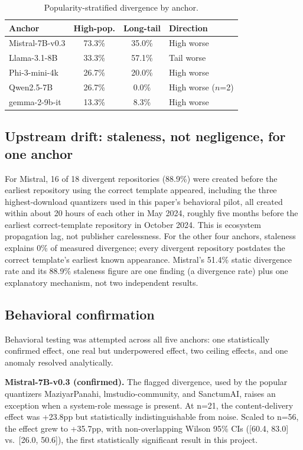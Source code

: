 \documentclass[letterpaper,twocolumn,10pt]{article}
\begin{document}
\begin{table}[t]
\caption{Popularity-stratified divergence by anchor.}
\label{tab:popularity}
\centering
\small
\begin{tabular}{lccl}
\toprule
Anchor & High-pop. & Long-tail & Direction \\
\midrule
Mistral-7B-v0.3 & 73.3\% & 35.0\% & High worse \\
Llama-3.1-8B & 33.3\% & 57.1\% & Tail worse \\
Phi-3-mini-4k & 26.7\% & 20.0\% & High worse \\
Qwen2.5-7B & 26.7\% & 0.0\% & High worse ($n$=2) \\
gemma-2-9b-it & 13.3\% & 8.3\% & High worse \\
\bottomrule
\end{tabular}
\end{table}

\subsection{Upstream drift: staleness, not negligence, for one anchor}

For Mistral, 16 of 18 divergent repositories (88.9\%) were created before the earliest repository using the correct template appeared, including the three highest-download quantizers used in this paper's behavioral pilot, all created within about 20 hours of each other in May 2024, roughly five months before the earliest correct-template repository in October 2024. This is ecosystem propagation lag, not publisher carelessness. For the other four anchors, staleness explains 0\% of measured divergence; every divergent repository postdates the correct template's earliest known appearance. Mistral's 51.4\% static divergence rate and its 88.9\% staleness figure are one finding (a divergence rate) plus one explanatory mechanism, not two independent results.

\subsection{Behavioral confirmation}

Behavioral testing was attempted across all five anchors: one statistically confirmed effect, one real but underpowered effect, two ceiling effects, and one anomaly resolved analytically.

\textbf{Mistral-7B-v0.3 (confirmed).} The flagged divergence, used by the popular quantizers MaziyarPanahi, lmstudio-community, and SanctumAI, raises an exception when a system-role message is present. At n=21, the content-delivery effect was +23.8pp but statistically indistinguishable from noise. Scaled to n=56, the effect grew to +35.7pp, with non-overlapping Wilson 95\% CIs ([60.4, 83.0] vs.\ [26.0, 50.6]), the first statistically significant result in this project.
\end{document}
